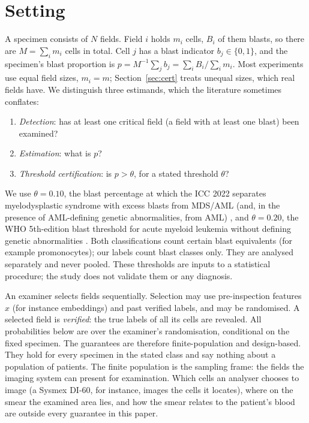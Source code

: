 \documentclass[11pt]{article}
\theoremstyle{remark}
\theoremstyle{definition}
\begin{document}
\section{Setting}
A specimen consists of $N$ fields. Field $i$ holds $m_i$ cells, $B_i$ of them blasts, so there are $M=\sum_i m_i$ cells in total. Cell $j$ has a blast indicator $b_j\in\{0,1\}$, and the specimen's blast proportion is $p=M^{-1}\sum_j b_j=\sum_i B_i/\sum_i m_i$. Most experiments use equal field sizes, $m_i=m$; Section~\ref{sec:cert} treats unequal sizes, which real fields have. We distinguish three estimands, which the literature sometimes conflates:
\begin{enumerate}
\item \emph{Detection}: has at least one critical field (a field with at least one blast) been examined?
\item \emph{Estimation}: what is $p$?
\item \emph{Threshold certification}: is $p>\theta$, for a stated threshold $\theta$?
\end{enumerate}
We use $\theta=0.10$, the blast percentage at which the ICC 2022 separates myelodysplastic syndrome with excess blasts from MDS/AML (and, in the presence of AML-defining genetic abnormalities, from AML) \cite{arber2022icc}, and $\theta=0.20$, the WHO 5th-edition blast threshold for acute myeloid leukemia without defining genetic abnormalities \cite{khoury2022who}. Both classifications count certain blast equivalents (for example promonocytes); our labels count blast classes only. They are analysed separately and never pooled. These thresholds are inputs to a statistical procedure; the study does not validate them or any diagnosis.

An examiner selects fields sequentially. Selection may use pre-inspection features $x$ (for instance embeddings) and past verified labels, and may be randomised. A selected field is \emph{verified}: the true labels of all its cells are revealed. All probabilities below are over the examiner's randomisation, conditional on the fixed specimen. The guarantees are therefore finite-population and design-based. They hold for every specimen in the stated class and say nothing about a population of patients. The finite population is the sampling frame: the fields the imaging system can present for examination. Which cells an analyser chooses to image (a Sysmex DI-60, for instance, images the cells it locates), where on the smear the examined area lies, and how the smear relates to the patient's blood are outside every guarantee in this paper.
\end{document}
